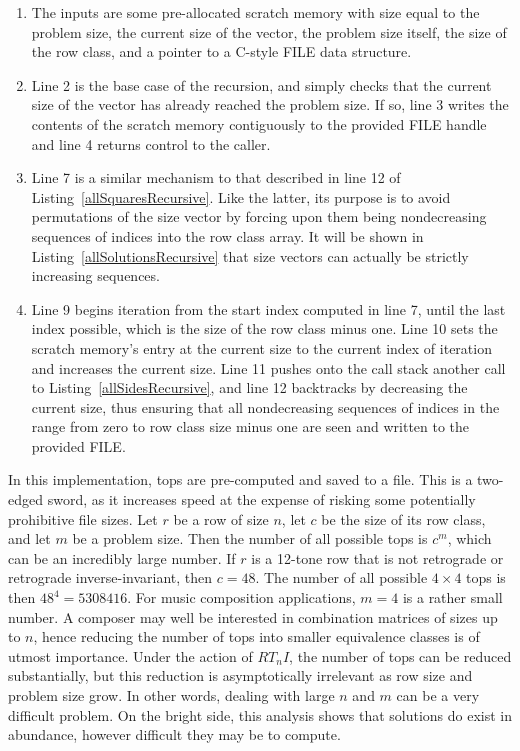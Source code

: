 \begin{enumerate}
\item The inputs are some pre-allocated scratch memory with size equal to the problem size, the current size of the vector, the problem size itself, the size of the row class, and a pointer to a C-style FILE data structure.
\item Line 2 is the base case of the recursion, and simply checks that the current size of the vector has already reached the problem size. If so, line 3 writes the contents of the scratch memory contiguously to the provided FILE handle and line 4 returns control to the caller.
\addtocounter{enumi}{4}
\item Line 7 is a similar mechanism to that described in line 12 of Listing~\ref{allSquaresRecursive}. Like the latter, its purpose is to avoid permutations of the size vector by forcing upon them being nondecreasing sequences of indices into the row class array. It will be shown in Listing~\ref{allSolutionsRecursive} that size vectors can actually be strictly increasing sequences.
\addtocounter{enumi}{1}
\item Line 9 begins iteration from the start index computed in line 7, until the last index possible, which is the size of the row class minus one. Line 10 sets the scratch memory's entry at the current size to the current index of iteration and increases the current size. Line 11 pushes onto the call stack another call to Listing~\ref{allSidesRecursive}, and line 12 backtracks by decreasing the current size, thus ensuring that all nondecreasing sequences of indices in the range from zero to row class size minus one are seen and written to the provided FILE.
\end{enumerate}

In this implementation, tops are pre-computed and saved to a file. This is a two-edged sword, as it increases speed at the expense of risking some potentially prohibitive file sizes. Let $r$ be a row of size $n$, let $c$ be the size of its row class, and let $m$ be a problem size. Then the number of all possible tops is $c^m$, which can be an incredibly large number. If $r$ is a 12-tone row that is not retrograde or retrograde inverse-invariant, then $c = 48$. The number of all possible $4 \times 4$ tops is then $48^4 = 5308416$. For music composition applications, $m = 4$ is a rather small number. A composer may well be interested in combination matrices of sizes up to $n$, hence reducing the number of tops into smaller equivalence classes is of utmost importance. Under the action of $RT_nI$, the number of tops can be reduced substantially, but this reduction is asymptotically irrelevant as row size and problem size grow. In other words, dealing with large $n$ and $m$ can be a very difficult problem. On the bright side, this analysis shows that solutions do exist in abundance, however difficult they may be to compute.

